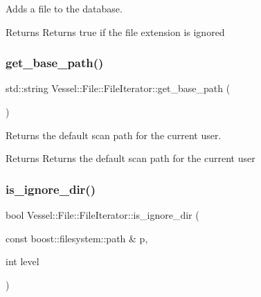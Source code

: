 Adds a file to the database. 

\begin{DoxyReturn}{Returns}
Returns true if the file extension is ignored 
\end{DoxyReturn}
\mbox{\label{class_vessel_1_1_file_1_1_file_iterator_a8701998833ac62c2618d815fc100f6d1}} 
\subsubsection{\texorpdfstring{get\+\_\+base\+\_\+path()}{get\_base\_path()}}
{\footnotesize\ttfamily std\+::string Vessel\+::\+File\+::\+File\+Iterator\+::get\+\_\+base\+\_\+path (\begin{DoxyParamCaption}{ }\end{DoxyParamCaption})}



Returns the default scan path for the current user. 

\begin{DoxyReturn}{Returns}
Returns the default scan path for the current user 
\end{DoxyReturn}
\mbox{\label{class_vessel_1_1_file_1_1_file_iterator_aed179f0336b6955a56fc97905404faef}} 
\subsubsection{\texorpdfstring{is\+\_\+ignore\+\_\+dir()}{is\_ignore\_dir()}}
{\footnotesize\ttfamily bool Vessel\+::\+File\+::\+File\+Iterator\+::is\+\_\+ignore\+\_\+dir (\begin{DoxyParamCaption}\item[{const boost\+::filesystem\+::path \&}]{p,  }\item[{int}]{level }\end{DoxyParamCaption})}



